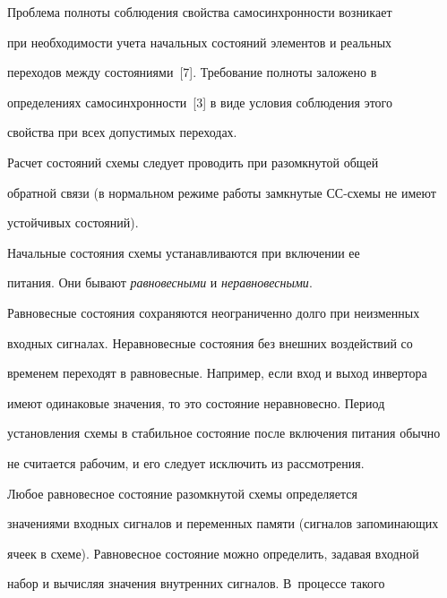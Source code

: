      \vspace*{-2pt}


      


      Проблема полноты соблюдения свойства самосинхронности возникает 


при необходимости учета начальных состояний элементов и реальных 


переходов между состояниями~[7]. Требование полноты заложено в 


определениях самосинхронности~[3] в виде условия соблюдения этого 


свойства при всех допустимых переходах.


      


      Расчет состояний схемы следует проводить при разомкнутой общей 


обратной связи (в нормальном режиме работы замкнутые СС-схе\-мы не имеют 


устойчивых состояний).


      


      Начальные состояния схемы устанавливаются при включении ее 


питания. Они бывают \textit{равновесными} и \textit{неравновесными}. 


Равновесные состояния сохраняются неограниченно долго при неизменных 


входных сигналах. Неравновесные состояния без внешних воздействий со 


временем переходят в равновесные. Например, если вход и выход инвертора 


имеют одинаковые значения, то это состояние неравновесно. Период 


установления схемы в стабильное состояние после включения питания обычно 


не считается рабочим, и его следует исключить из рассмотрения.


      


      Любое равновесное состояние разомкнутой схемы определяется 


значениями входных сигналов и переменных памяти (сигналов запоминающих 


ячеек в схеме). Равновесное состояние можно определить, задавая входной 


набор и вычисляя значения внутренних сигналов. В~процессе такого 


